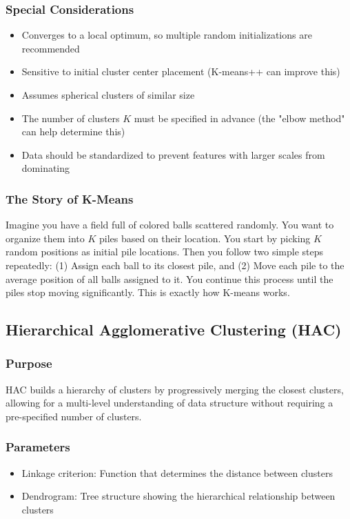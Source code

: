 \documentclass{article}
\begin{document}
\subsubsection{Special Considerations}
\begin{itemize}
    \item Converges to a local optimum, so multiple random initializations are recommended
    \item Sensitive to initial cluster center placement (K-means++ can improve this)
    \item Assumes spherical clusters of similar size
    \item The number of clusters $K$ must be specified in advance (the "elbow method" can help determine this)
    \item Data should be standardized to prevent features with larger scales from dominating
\end{itemize}

\subsubsection{The Story of K-Means}
Imagine you have a field full of colored balls scattered randomly. You want to organize them into $K$ piles based on their location. You start by picking $K$ random positions as initial pile locations. Then you follow two simple steps repeatedly: (1) Assign each ball to its closest pile, and (2) Move each pile to the average position of all balls assigned to it. You continue this process until the piles stop moving significantly. This is exactly how K-means works.

\subsection{Hierarchical Agglomerative Clustering (HAC)}

\subsubsection{Purpose}
HAC builds a hierarchy of clusters by progressively merging the closest clusters, allowing for a multi-level understanding of data structure without requiring a pre-specified number of clusters.

\subsubsection{Parameters}
\begin{itemize}
    \item Linkage criterion: Function that determines the distance between clusters
    \item Dendrogram: Tree structure showing the hierarchical relationship between clusters
\end{itemize}
\end{document}
